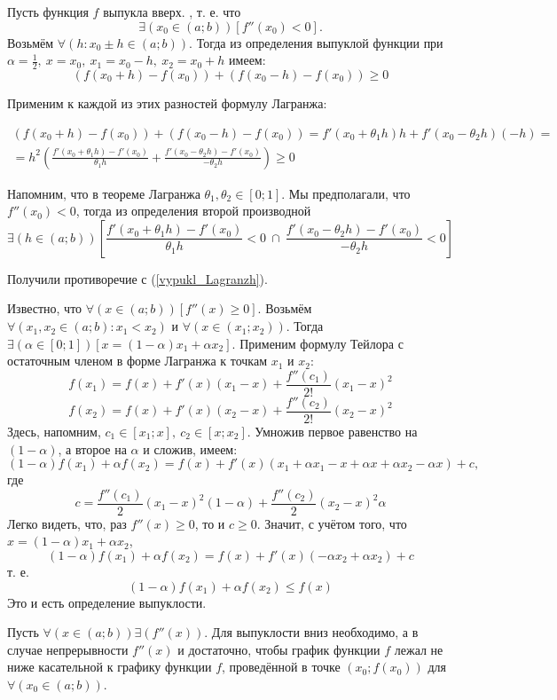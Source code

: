 \neobh
Пусть функция $f$ выпукла вверх.
\pp, т. е. что
$$
\exists(x_0\in(a;b))[f''(x_0)<0].
$$
Возьмём $\forall(h:x_0\pm h\in(a;b))$. Тогда из определения выпуклой функции при $\alpha=\frac{1}{2},~x=x_0,~x_1=x_0-h,~x_2=x_0+h$ имеем:
$$
(f(x_0+h)-f(x_0))+(f(x_0-h)-f(x_0))\geq 0
$$

Применим к каждой из этих разностей формулу Лагранжа:

\begin{multline}\label{vypukl_Lagranzh}
(f(x_0+h)-f(x_0))+(f(x_0-h)-f(x_0))=
f'(x_0+\theta_1 h)h+f'(x_0-\theta_2 h)(-h)=\\=
h^2\left(  \frac{f'(x_0+\theta_1 h)-f'(x_0)}{\theta_1 h} + \frac{f'(x_0-\theta_2 h)-f'(x_0)}{-\theta_2 h} \right)  \geq 0
\end{multline}

Напомним, что в теореме Лагранжа $\theta_1,\theta_2 \in [0;1]$.
Мы предполагали, что $f''(x_0)<0$, тогда из определения второй производной
$$
\exists(h\in(a;b))\left[
\frac{f'(x_0+\theta_1 h)-f'(x_0)}{\theta_1 h}<0
~\cap~
\frac{f'(x_0-\theta_2 h)-f'(x_0)}{-\theta_2 h}<0
\right]
$$

Получили противоречие с (\ref{vypukl_Lagranzh}).

\dost
Известно, что $\forall(x\in(a;b))[f''(x)\geq 0]$.
Возьмём $\forall(x_1,x_2 \in (a;b) : x_1 < x_2)$ и $\forall(x\in(x_1;x_2))$.
Тогда $\exists(\alpha\in[0;1])[x=(1-\alpha)x_1+\alpha x_2]$.
Применим формулу Тейлора с остаточным членом в форме Лагранжа к точкам $x_1$ и $x_2$:
$$
f(x_1)=f(x)+f'(x)(x_1-x)+\frac{f''(c_1)}{2!}(x_1-x)^2
$$
$$
f(x_2)=f(x)+f'(x)(x_2-x)+\frac{f''(c_2)}{2!}(x_2-x)^2
$$
Здесь, напомним, $c_1\in[x_1;x],~c_2\in[x;x_2]$. Умножив первое равенство на $(1-\alpha)$, а второе на $\alpha$ и сложив, имеем:
$$
(1-\alpha)f(x_1)+\alpha f(x_2)=f(x)+f'(x)(x_1+\alpha x_1 - x + \alpha x + \alpha x_2 - \alpha x)+c,
$$
где
$$
c=\frac{f''(c_1)}{2}(x_1-x)^2 (1-\alpha)+\frac{f''(c_2)}{2}(x_2-x)^2 \alpha
$$
Легко видеть, что, раз $f''(x)\geq 0$, то и $c\geq 0$.
Значит, с учётом того, что $x=(1-\alpha)x_1+\alpha x_2$, 
$$
(1-\alpha)f(x_1)+\alpha f (x_2)=f(x)+f'(x)(-\alpha x_2 + \alpha x_2)+c
$$
т. е.
$$
(1-\alpha)f(x_1)+\alpha f (x_2) \leq f(x) 
$$
Это и есть определение выпуклости.
\dokno

\begin{teorema}\label{vypukl_th_2}
Пусть $\forall(x\in(a;b))\exists(f''(x))$. Для выпуклости вниз необходимо, а в случае непрерывности $f''(x)$ и достаточно, чтобы график функции $f$ лежал не ниже касательной к графику функции $f$, проведённой в точке $(x_0;f(x_0))$ для $\forall (x_0\in(a;b))$.
\end{teorema}

